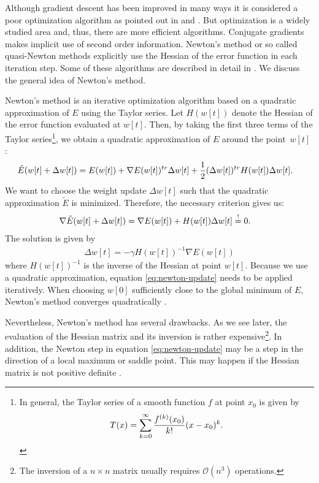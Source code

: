 Although gradient descent has been improved in many ways it is considered a poor optimization algorithm as pointed out in \cite[p.~268-269]{Bishop:1995} and \cite[p.~240-241]{Bishop:2006}. But optimization is a widely studied area and, thus, there are more efficient algorithms. Conjugate gradients makes implicit use of second order information. Newton's method or so called quasi-Newton methods explicitly use the Hessian of the error function in each iteration step. Some of these algorithms are described in detail in \cite[p.~274-290]{GillMurrayWright:1997}. We discuss the general idea of Newton's method.

Newton's method is an iterative optimization algorithm based on a quadratic approximation of $E$ using the Taylor series. Let $H(w[t])$ denote the Hessian of the error function evaluated at $w[t]$. Then, by taking the first three terms of the Taylor series\footnote{In general, the Taylor series of a smooth function $f$ at point $x_0$ is given by \begin{align}T(x) = \sum _{k = 0} ^\infty \frac{f^{(k)} (x_0)}{k!} (x - x_0)^k\onedot\end{align}}, we obtain a quadratic approximation of $E$ around the point~$w[t]$ \cite[p.~105-106]{GillMurrayWright:1997}:
\begin{align}
\tilde{E}(w[t] + \Delta w[t]) & = E(w[t]) + \nabla E(w[t])^{tr} \Delta w[t] + \frac{1}{2} (\Delta w[t])^{tr} H(w[t]) \Delta w[t]\onedot
\end{align}
We want to choose the weight update $\Delta w[t]$ such that the quadratic approximation $\tilde{E}$ is minimized. Therefore, the necessary criterion gives us:
\begin{align}
\nabla \tilde{E}(w[t] + \Delta w[t]) & = \nabla E(w[t]) + H(w[t]) \Delta w[t] \overset{!}{=} 0\onedot
\end{align}
The solution is given by
\begin{align}
\label{eq:newton-update}
\Delta w[t] = - \gamma H(w[t])^{-1} \nabla E(w[t])
\end{align}
where $H(w[t])^{-1}$ is the inverse of the Hessian at point $w[t]$. Because we use a quadratic approximation, equation \eqref{eq:newton-update} needs to be applied iteratively. When choosing $w[0]$ sufficiently close to the global minimum of $E$, Newton's method converges quadratically \cite[p.~105-106]{GillMurrayWright:1997}.

Nevertheless, Newton's method has several drawbacks. As we see later, the evaluation of the Hessian matrix and its inversion is rather expensive\footnote{The inversion of a $n \times n$ matrix usually requires $\mathcal{O}(n^3)$ operations.}. In addition, the Newton step in equation \eqref{eq:newton-update} may be a step in the direction of a local maximum or saddle point. This may happen if the Hessian matrix is not positive definite \cite[p.~285-287]{Bishop:1995}.

